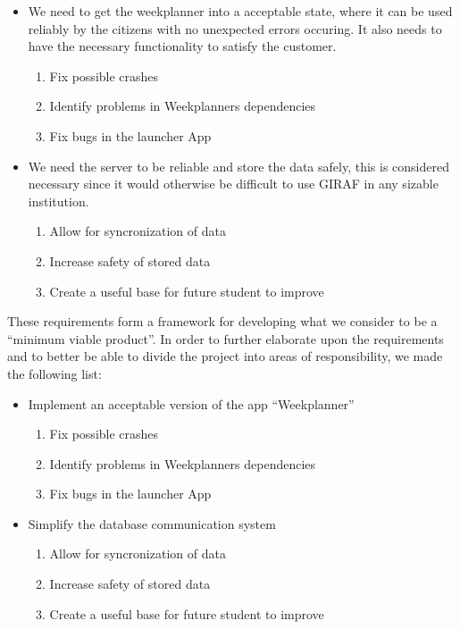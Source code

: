 \begin{itemize}
  \item We need to get the weekplanner into a acceptable state, where it can be
  used reliably by the citizens with no unexpected errors occuring. It also
  needs to have the necessary functionality to satisfy the customer.
    	\begin{enumerate}
  		\item Fix possible crashes
  		\item Identify problems in Weekplanners dependencies
  		\item Fix bugs in the launcher App
	\end{enumerate}
  \item We need the server to be reliable and store the data safely, this is
  considered necessary since it would otherwise be difficult to use GIRAF in any
  sizable institution.
    \begin{enumerate}
  		\item Allow for syncronization of data
  		\item Increase safety of stored data
  		\item Create a useful base for future student to improve
	\end{enumerate}
\end{itemize}

These requirements form a framework for developing what we consider to be a
``minimum viable product''. In order to further elaborate upon the requirements
and to better be able to divide the project into areas of responsibility, we
made the following list:

\begin{itemize}
  \item Implement an acceptable version of the app ``Weekplanner''
  	\begin{enumerate}
  		\item Fix possible crashes
  		\item Identify problems in Weekplanners dependencies
  		\item Fix bugs in the launcher App
	\end{enumerate}
  \item Simplify the database communication system
   	\begin{enumerate}
  		\item Allow for syncronization of data
  		\item Increase safety of stored data
  		\item Create a useful base for future student to improve
	\end{enumerate}
\end{itemize}

